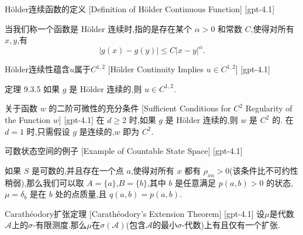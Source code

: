 \documentclass[UTF8]{ctexart}
\begin{document}
    
    
    \begin{dfn}
        {Hölder连续函数的定义}
        [Definition of Hölder Continuous Function]
        [gpt-4.1]
        
当我们称一个函数是 Hölder 连续时,指的是存在某个 $\alpha > 0$ 和常数 $C$,使得对所有 $x, y$,有
\[
|g(x) - g(y)| \leq C |x - y|^\alpha.
\]

    \end{dfn}
    
    
    
    \begin{thm}
        {Hölder连续性蕴含$
    u$属于$C^{1,2}$}
        [Hölder Continuity Implies $
    u \in C^{1,2}$]
        [gpt-4.1]
        
定理 9.3.5 如果 $g$ 是 Hölder 连续的,则 $
u \in C^{1,2}$.

    \end{thm}
    
    
    
    \begin{thm}
        {关于函数 $w$ 的二阶可微性的充分条件}
        [Sufficient Conditions for $C^2$ Regularity of the Function $w$]
        [gpt-4.1]
        在 $d \ge 2$ 时,如果 $g$ 是 Hölder 连续的,则 $w$ 是 $C^2$ 的.
在 $d = 1$ 时,只需假设 $g$ 是连续的,$w$ 即为 $C^2$.
    \end{thm}
    
    
    
    \begin{xmp}
        {可数状态空间的例子}
        [Example of Countable State Space]
        [gpt-4.1]
        
如果 $S$ 是可数的,并且存在一个点 $a$,使得对所有 $x$ 都有 $\rho_{x a} > 0$(该条件比不可约性稍弱),那么我们可以取 $A = \{ a \}$,$B = \{ b \}$,其中 $b$ 是任意满足 $p(a, b) > 0$ 的状态,$\mu = \delta_b$ 是在 $b$ 处的点质量,且 $q(a, b) = p(a, b)$.

    \end{xmp}
    
    
    
    \begin{thm}
        {Carathéodory扩张定理}
        [Carathéodory's Extension Theorem]
        [gpt-4.1]
        设$\mu$是代数$\mathcal{A}$上的$\sigma$-有限测度.那么$\mu$在$\sigma(\mathcal{A})$(包含$\mathcal{A}$的最小$\sigma$-代数)上有且仅有一个扩张.
    \end{thm}
    
\end{document}
